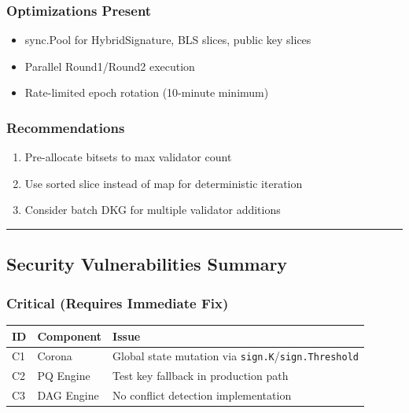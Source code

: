 \documentclass[
]{article}
\newcounter{none} %
\providecommand{\tightlist}{%
  \setlength{\itemsep}{0pt}\setlength{\parskip}{0pt}}
\begin{document}
\subsubsection{Optimizations Present}\label{optimizations-present}

\begin{itemize}
\tightlist
\item
  sync.Pool for HybridSignature, BLS slices, public key slices
\item
  Parallel Round1/Round2 execution
\item
  Rate-limited epoch rotation (10-minute minimum)
\end{itemize}

\subsubsection{Recommendations}\label{recommendations}

\begin{enumerate}
\def\labelenumi{\arabic{enumi}.}
\tightlist
\item
  Pre-allocate bitsets to max validator count
\item
  Use sorted slice instead of map for deterministic iteration
\item
  Consider batch DKG for multiple validator additions
\end{enumerate}

\begin{center}\rule{0.5\linewidth}{0.5pt}\end{center}

\subsection{Security Vulnerabilities
Summary}\label{security-vulnerabilities-summary}

\subsubsection{Critical (Requires Immediate
Fix)}\label{critical-requires-immediate-fix}

{\def\LTcaptype{none} %
\begin{longtable}[]{@{}lll@{}}
\toprule\noalign{}
ID & Component & Issue \\
\midrule\noalign{}
\endhead
\bottomrule\noalign{}
\endlastfoot
C1 & Corona & Global state mutation via
\texttt{sign.K}/\texttt{sign.Threshold} \\
C2 & PQ Engine & Test key fallback in production path \\
C3 & DAG Engine & No conflict detection implementation \\
\end{longtable}
}
\end{document}
